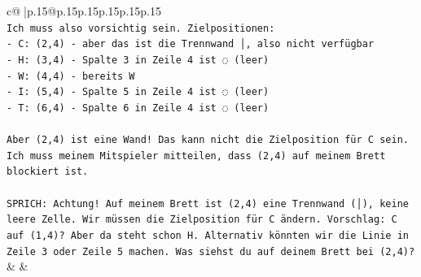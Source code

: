 \documentclass{article}
\begin{document}
{\begin{supertabular}{c@{$\;$}|p{.15\linewidth}@{}p{.15\linewidth}p{.15\linewidth}p{.15\linewidth}p{.15\linewidth}p{.15\linewidth}}
{{{\\ 
\texttt{Ich muss also vorsichtig sein. Zielpositionen:} \\
\texttt{{-} C: (2,4) {-} aber das ist die Trennwand │, also nicht verfügbar} \\
\texttt{{-} H: (3,4) {-} Spalte 3 in Zeile 4 ist ◌ (leer)} \\
\texttt{{-} W: (4,4) {-} bereits W} \\
\texttt{{-} I: (5,4) {-} Spalte 5 in Zeile 4 ist ◌ (leer)} \\
\texttt{{-} T: (6,4) {-} Spalte 6 in Zeile 4 ist ◌ (leer)} \\
\\ 
\texttt{Aber (2,4) ist eine Wand! Das kann nicht die Zielposition für C sein. Ich muss meinem Mitspieler mitteilen, dass (2,4) auf meinem Brett blockiert ist.} \\
\\ 
\texttt{SPRICH: Achtung! Auf meinem Brett ist (2,4) eine Trennwand (│), keine leere Zelle. Wir müssen die Zielposition für C ändern. Vorschlag: C auf (1,4)? Aber da steht schon H. Alternativ könnten wir die Linie in Zeile 3 oder Zeile 5 machen. Was siehst du auf deinem Brett bei (2,4)?} \\
            }
        }
    }
    & & \\ \\


\end{supertabular}}
\end{document}
